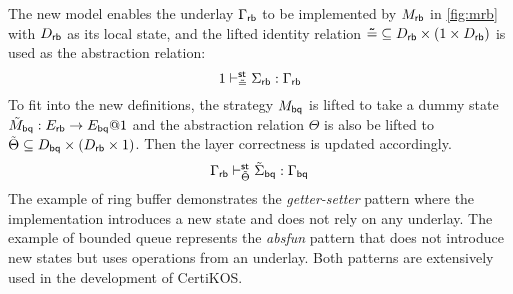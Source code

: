 \documentclass[acmsmall,review,anonymous]{acmart}\settopmatter{printfolios=true,printccs=false,printacmref=false}
\begin{document}
The new model enables the underlay $\Gamma_{ \mathsf{rb} }$
to be implemented
by $M_{ \mathsf{rb} }$ in \autoref{fig:mrb}
with $D_{ \mathsf{rb} }$ as its local state,
and the lifted identity relation
$ \mathsf{\tilde{=}} \subseteq D_{ \mathsf{rb} } \times (1 \times D_{ \mathsf{rb} })$
is used as the abstraction relation:
\[
  1 \vdash^{ \mathsf{st} }_{ \mathsf{\tilde{=}} } \Sigma_{ \mathsf{rb} } : \Gamma_{ \mathsf{rb} }
\]
To fit into the new definitions,
the strategy $M_{ \mathsf{bq} }$
is lifted to take a dummy state
$\tilde{M}_{ \mathsf{bq} }: E_{ \mathsf{rb} } \rightarrow E_{ \mathsf{bq} }@1$
and the abstraction relation $\Theta$
is also be lifted to
$\tilde{\Theta} \subseteq D_{ \mathsf{bq} } \times (D_{ \mathsf{rb} } \times 1)$.
Then the layer correctness is
updated accordingly.
\[
  \Gamma_{ \mathsf{rb} } \vdash^{ \mathsf{st} }_{\tilde{\Theta}}
  \tilde{\Sigma}_{ \mathsf{bq} } : \Gamma_{ \mathsf{bq} }
\]
The example of ring buffer
demonstrates the \emph{getter-setter} pattern
where the implementation
introduces a new state and does not rely on any underlay.
The example of bounded queue
represents the \emph{absfun} pattern
that does not introduce new states
but uses operations from an underlay.
Both patterns are extensively used in the development
of CertiKOS.

\end{document}
